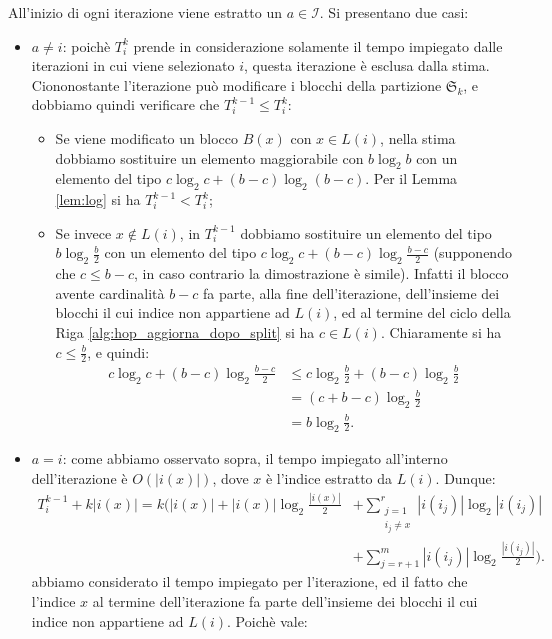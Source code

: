 \begin{proof2}
    All'inizio di ogni iterazione viene estratto un $a \in \mathcal{I}$. Si presentano due casi:
    \begin{itemize}
        \item $a \neq i$: poichè $T_i^k$ prende in considerazione solamente il tempo impiegato dalle iterazioni in cui viene selezionato $i$, questa iterazione è esclusa dalla stima. Ciononostante l'iterazione può modificare i blocchi della partizione $\mathfrak{S}_k$, e dobbiamo quindi verificare che $T_i^{k-1} \leq T_i^k$:
        \begin{itemize}
            \item Se viene modificato un blocco $B(x)$ con $x \in L(i)$, nella stima dobbiamo sostituire un elemento maggiorabile con $b \log_2 b$ con un elemento del tipo $c \log_2 c + (b-c) \log_2 (b-c)$. Per il Lemma \ref{lem:log} si ha $T_i^{k-1} < T_i^k$;
            \item Se invece $x \not\in L(i)$, in $T_i^{k-1}$ dobbiamo sostituire un elemento del tipo $b \log_2 \frac{b}{2}$ con un elemento del tipo $c \log_2 c + (b-c) \log_2 \frac{b-c}{2}$ (supponendo che $c \leq b - c$, in caso contrario la dimostrazione è simile). Infatti il blocco avente cardinalità $b-c$ fa parte, alla fine dell'iterazione, dell'insieme dei blocchi il cui indice non appartiene ad $L(i)$, ed al termine del ciclo della Riga \ref{alg:hop_aggiorna_dopo_split} si ha $c \in L(i)$. Chiaramente si ha $c \leq \frac{b}{2}$, e quindi:
            \begin{align*}
                c \log_2 c + (b-c) \log_2 \frac{b-c}{2} &\leq c \log_2 \frac{b}{2} + (b-c) \log_2 \frac{b}{2}\\
                &= (c + b - c) \log_2 \frac{b}{2}\\
                &= b \log_2 \frac{b}{2}.
            \end{align*}
        \end{itemize}
        \item $a = i$: come abbiamo osservato sopra, il tempo impiegato all'interno dell'iterazione è $O(|i(x)|)$, dove $x$ è l'indice estratto da $L(i)$. Dunque:
        \begin{align*}
            T_i^{k-1} + k|i(x)| = k \Bigg( |i(x)| + |i(x)|\log_2 \frac{|i(x)|}{2} &+ \sum_{\substack{j = 1\\i_j \neq x}}^r |i(i_j)|\log_2|i(i_j)| \\
            &+ \sum_{j = r+1}^m |i(i_j)|\log_2\frac{|i(i_j)|}{2}\Bigg).
         \end{align*}
        abbiamo considerato il tempo impiegato per l'iterazione, ed il fatto che l'indice $x$ al termine dell'iterazione fa parte dell'insieme dei blocchi il cui indice non appartiene ad $L(i)$. Poichè vale:

\end{itemize}
\end{proof2}
